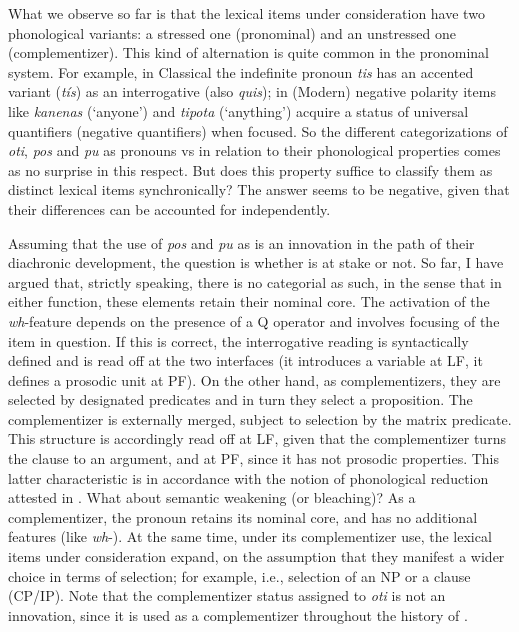 \documentclass[output=paper]{langsci/langscibook}
\begin{document}
What we observe so far is that the lexical items under consideration have two
phonological variants: a stressed one (pronominal) and an unstressed one
(complementizer). This kind of alternation is quite common in the pronominal
system. For example, in Classical  the indefinite pronoun \emph{tis} has
an accented variant (\emph{tís}) as an interrogative (also  \emph{quis});
in (Modern)  negative polarity items like \emph{kanenas} (‘anyone’) and
\emph{tipota} (‘anything’) acquire a status of universal quantifiers (negative
quantifiers) when focused. So the different categorizations of \emph{oti},
\emph{pos} and \emph{pu} as pronouns vs  in relation to their
phonological properties comes as no surprise in this respect. But does this
property suffice to classify them as distinct lexical items synchronically? The
answer seems to be negative, given that their differences can be accounted for
independently.

Assuming that the use of \emph{pos} and \emph{pu} as  is
an innovation in the path of their diachronic development, the question is
whether  is at stake or not. So far, I have argued that,
strictly speaking, there is no categorial
 as such, in the sense that in either function, these elements
retain their nominal core. The activation of the \emph{wh}-feature depends on
the presence of a Q operator and involves focusing of the item in question. If
this is correct, the interrogative reading is syntactically defined and is read
off at the two interfaces (it introduces a variable at \gls{LF}, it defines a
prosodic unit at \gls{PF}). On the other hand, as complementizers, they are
selected by designated predicates and in turn they select a proposition. The
complementizer is externally merged, subject to selection
by the matrix predicate. This structure is accordingly read off at \gls{LF},
given that the complementizer turns the clause to an
argument, and at \gls{PF}, since it has not prosodic properties. This latter
characteristic is in accordance with the notion of phonological reduction
attested in . What about semantic weakening (or bleaching)?
As a complementizer, the pronoun retains its nominal core, and has no
additional features (like \emph{wh}-). At the same time, under its
complementizer use, the lexical items under consideration
expand, on the assumption that they manifest a wider choice in terms of
selection; for example, i.e., selection of an NP or a clause (CP/IP). Note that
the complementizer status assigned to \emph{oti} is not an
innovation, since it is used as a complementizer throughout
the history of .
\end{document}
